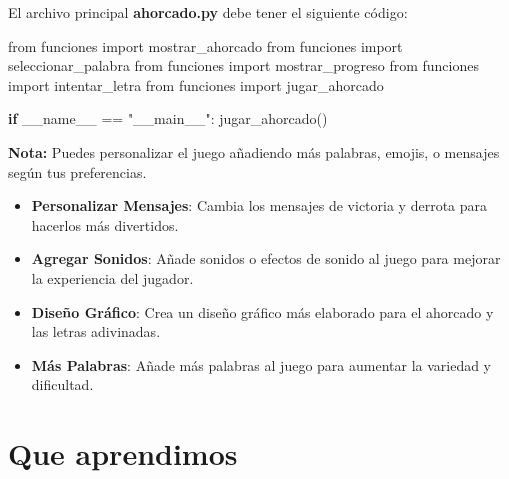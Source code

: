 \documentclass[
  a4paper,
  DIV=11,
  numbers=noendperiod,
  onepage,
  openany]{scrreprt}
\newenvironment{Shaded}{\begin{snugshade}}{\end{snugshade}}
\newcommand{\ControlFlowTok}[1]{\textcolor[rgb]{0.00,0.23,0.31}{\textbf{#1}}}
\newcommand{\ImportTok}[1]{\textcolor[rgb]{0.00,0.46,0.62}{#1}}
\newcommand{\NormalTok}[1]{\textcolor[rgb]{0.00,0.23,0.31}{#1}}
\newcommand{\OperatorTok}[1]{\textcolor[rgb]{0.37,0.37,0.37}{#1}}
\newcommand{\StringTok}[1]{\textcolor[rgb]{0.13,0.47,0.30}{#1}}
\newcommand{\VariableTok}[1]{\textcolor[rgb]{0.07,0.07,0.07}{#1}}
\begin{document}
El archivo principal \textbf{ahorcado.py} debe tener el siguiente
código:

\begin{Shaded}
\begin{Highlighting}[]
\ImportTok{from}\NormalTok{ funciones }\ImportTok{import}\NormalTok{ mostrar\_ahorcado}
\ImportTok{from}\NormalTok{ funciones }\ImportTok{import}\NormalTok{ seleccionar\_palabra}
\ImportTok{from}\NormalTok{ funciones }\ImportTok{import}\NormalTok{ mostrar\_progreso}
\ImportTok{from}\NormalTok{ funciones }\ImportTok{import}\NormalTok{ intentar\_letra}
\ImportTok{from}\NormalTok{ funciones }\ImportTok{import}\NormalTok{ jugar\_ahorcado}

\ControlFlowTok{if} \VariableTok{\_\_name\_\_} \OperatorTok{==} \StringTok{"\_\_main\_\_"}\NormalTok{:}
\NormalTok{    jugar\_ahorcado()}
\end{Highlighting}
\end{Shaded}

\begin{tcolorbox}[enhanced jigsaw, toptitle=1mm, titlerule=0mm, left=2mm, opacityback=0, coltitle=black, leftrule=.75mm, title=\textcolor{quarto-callout-tip-color}{\faLightbulb}\hspace{0.5em}{Tip}, bottomrule=.15mm, arc=.35mm, opacitybacktitle=0.6, bottomtitle=1mm, toprule=.15mm, colbacktitle=quarto-callout-tip-color!10!white, rightrule=.15mm, breakable, colframe=quarto-callout-tip-color-frame, colback=white]

\textbf{Nota:} Puedes personalizar el juego añadiendo más palabras,
emojis, o mensajes según tus preferencias.

\end{tcolorbox}

\begin{itemize}
\item
  \textbf{Personalizar Mensajes}: Cambia los mensajes de victoria y
  derrota para hacerlos más divertidos.
\item
  \textbf{Agregar Sonidos}: Añade sonidos o efectos de sonido al juego
  para mejorar la experiencia del jugador.
\item
  \textbf{Diseño Gráfico}: Crea un diseño gráfico más elaborado para el
  ahorcado y las letras adivinadas.
\item
  \textbf{Más Palabras}: Añade más palabras al juego para aumentar la
  variedad y dificultad.
\end{itemize}

\chapter{Que aprendimos}\label{que-aprendimos}
\end{document}
